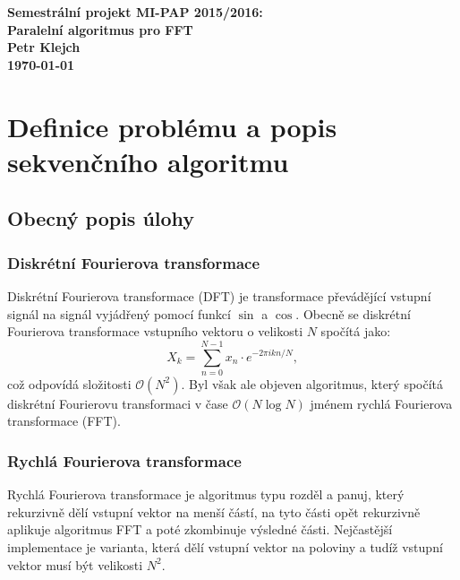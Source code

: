\documentclass[12pt]{article}
\begin{document}

\begin{center}
\bf Semestrální projekt MI-PAP 2015/2016:\\[5mm]
    Paralelní algoritmus pro FFT\\[5mm]
       Petr Klejch\\
\today
\end{center}

\section{Definice problému a popis sekvenčního algoritmu}

%
\subsection{Obecný popis úlohy}
\subsubsection{Diskrétní Fourierova transformace}
Diskrétní Fourierova transformace (DFT) je transformace převádějící vstupní signál na signál vyjádřený pomocí funkcí $\sin$ a $\cos$. Obecně se diskrétní Fourierova transformace vstupního vektoru o velikosti $N$ spočítá jako:
$$X_{k} = \sum_{n=0}^{N-1} x_n \cdot e^{-2 \pi i  k n / N},$$ což odpovídá složitosti $\mathcal{O}(N^2)$. 
Byl však ale objeven algoritmus, který spočítá diskrétní Fourierovu transformaci v čase $\mathcal{O}(N\log{N})$ jménem rychlá Fourierova transformace (FFT).
\subsubsection{Rychlá Fourierova transformace}
Rychlá Fourierova transformace je algoritmus typu rozděl a panuj, který rekurzivně dělí vstupní vektor na menší částí, na tyto části opět rekurzivně aplikuje algoritmus FFT a poté zkombinuje výsledné části. Nejčastější implementace je varianta, která dělí vstupní vektor na poloviny a tudíž vstupní vektor musí být velikosti $N^2$. 
\end{document}
